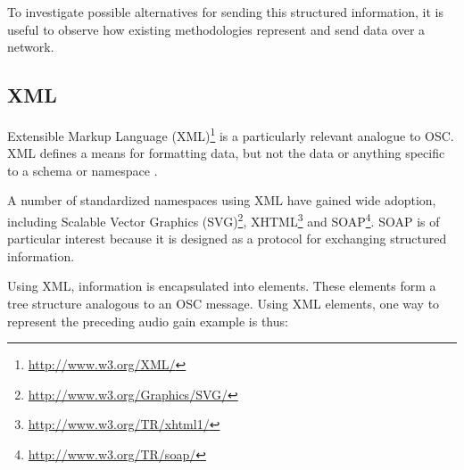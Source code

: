 \documentclass{NIME-alternate}
\begin{document}
To investigate possible alternatives for sending this structured information, it is useful to observe how existing methodologies  represent and send data over a network.

%
%
%



\subsection{XML} %
\label{sub:xml}

Extensible Markup Language (XML)\footnote{\url{http://www.w3.org/XML/}} is a particularly relevant analogue to OSC.  XML defines a means for formatting data, but not the data or anything specific to a schema or namespace \cite{xml:2006}. 

A number of standardized namespaces using XML have gained wide adoption, including Scalable Vector Graphics (SVG)\footnote{\url{http://www.w3.org/Graphics/SVG/}}, XHTML\footnote{\url{http://www.w3.org/TR/xhtml1/}} and SOAP\footnote{\url{http://www.w3.org/TR/soap/}}.  SOAP is of particular interest because it is designed as a protocol for exchanging structured information.

Using XML, information is encapsulated into elements. These elements form a tree structure analogous to an OSC message. Using XML elements, one way to represent the preceding audio gain example is thus:
\end{document}
